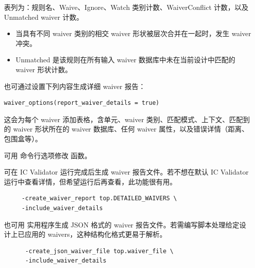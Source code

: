 表列为：规则名、Waive、Ignore、Watch 类别计数、WaiverConflict 计数，以及 Unmatched waiver 计数。
\begin{itemize}
  \item 当具有不同 waiver 类别的相交 waiver 形状被层次合并在一起时，发生 waiver 冲突。
  \item Unmatched 是该规则在所有输入 waiver 数据库中未在当前设计中匹配的 waiver 形状计数。
\end{itemize}

也可通过设置下列内容生成详细 waiver 报告：
\begin{lstlisting}[style=pxl]
waiver_options(report_waiver_details = true)
\end{lstlisting}

这会为每个 waiver 添加表格，含单元、waiver 类别、匹配模式、上下文、匹配到的 waiver 形状所在的 waiver 数据库、任何 waiver 属性，以及错误详情（距离、包围盒等）。

\begin{noteBox}
可用  命令行选项修改  函数。
\end{noteBox}

可在 IC Validator 运行完成后生成 waiver 报告文件。若不想在默认 IC Validator 运行中查看详情，但希望运行后再查看，此功能很有用。
\begin{lstlisting}[style=shell]
%icv_pydb -i ./run_details/pydb/PYDB_top \
     -create_waiver_report top.DETAILED_WAIVERS \
     -include_waiver_details
\end{lstlisting}

也可用  实用程序生成 JSON 格式的 waiver 报告文件。若需编写脚本处理给定设计上已应用的 waivers，这种结构化格式更易于解析。
\begin{lstlisting}[style=shell]
% icv_pydb -i ./run_details/pydb/PYDB_top \
      -create_json_waiver_file top.waiver_file \
      -include_waiver_details
\end{lstlisting}

